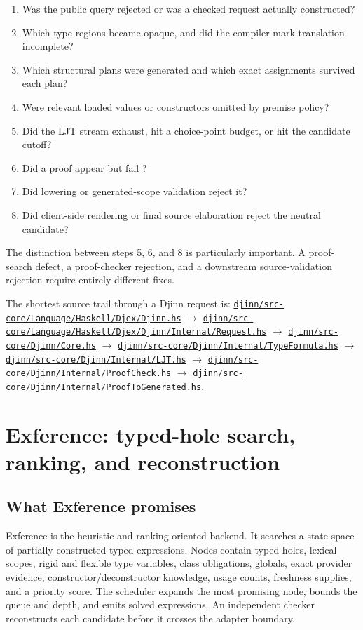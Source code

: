 \documentclass[10pt,letterpaper,oneside]{report}
\newcommand{\code}[1]{\texttt{\detokenize{#1}}}
\def\DjexBase{https://github.com/VladimirReshetnikov/Djex/blob/d3d9662598460316bdcd177ce6768c521e764aa8/}
\newcommand{\dpath}[1]{\href{\DjexBase#1}{\nolinkurl{#1}}}
\begin{document}
\begin{enumerate}
  \item Was the public query rejected or was a checked request actually constructed?
  \item Which type regions became opaque, and did the compiler mark translation incomplete?
  \item Which structural plans were generated and which exact assignments survived each plan?
  \item Were relevant loaded values or constructors omitted by premise policy?
  \item Did the LJT stream exhaust, hit a choice-point budget, or hit the candidate cutoff?
  \item Did a proof appear but fail \code{ProofCheck}?
  \item Did lowering or generated-scope validation reject it?
  \item Did client-side rendering or final source elaboration reject the neutral candidate?
\end{enumerate}

The distinction between steps 5, 6, and 8 is particularly important. A proof-search defect, a proof-checker rejection, and a downstream source-validation rejection require entirely different fixes.

\begin{sourcebox}
The shortest source trail through a Djinn request is: \dpath{djinn/src-core/Language/Haskell/Djex/Djinn.hs} $\rightarrow$ \dpath{djinn/src-core/Language/Haskell/Djex/Djinn/Internal/Request.hs} $\rightarrow$ \dpath{djinn/src-core/Djinn/Core.hs} $\rightarrow$ \dpath{djinn/src-core/Djinn/Internal/TypeFormula.hs} $\rightarrow$ \dpath{djinn/src-core/Djinn/Internal/LJT.hs} $\rightarrow$ \dpath{djinn/src-core/Djinn/Internal/ProofCheck.hs} $\rightarrow$ \dpath{djinn/src-core/Djinn/Internal/ProofToGenerated.hs}.
\end{sourcebox}

\chapter{Exference: typed-hole search, ranking, and reconstruction}\label{ch:exference}

\section{What Exference promises}

Exference is the heuristic and ranking-oriented backend. It searches a state space of partially constructed typed expressions. Nodes contain typed holes, lexical scopes, rigid and flexible type variables, class obligations, globals, exact provider evidence, constructor/deconstructor knowledge, usage counts, freshness supplies, and a priority score. The scheduler expands the most promising node, bounds the queue and depth, and emits solved expressions. An independent checker reconstructs each candidate before it crosses the adapter boundary.
\end{document}
